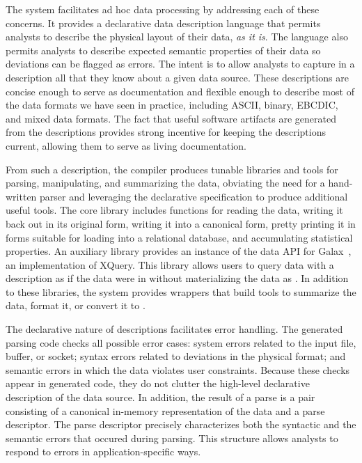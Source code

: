 \documentclass{sig-alternate}
\begin{document}
The \pads{} system facilitates ad hoc data processing by addressing
each of these concerns.  It provides a declarative data description
language that permits analysts to describe the physical layout of
their data, \textit{as it is}.  The language also permits analysts to
describe expected semantic properties of their data so deviations can
be flagged as errors. The intent is to allow analysts to capture in a
\pads{} description all that they know about a given data source.
These descriptions are concise enough to
serve as documentation and flexible enough to describe most of
the data formats we have seen in practice, including ASCII, binary,
EBCDIC, and mixed data formats.  The fact that useful software
artifacts are generated from the descriptions provides strong
incentive for keeping the descriptions current, allowing them to serve
as living documentation.  

From such a description, the \pads{} compiler produces tunable \C{} libraries
and tools for parsing, manipulating, and summarizing the data,
obviating the need for a hand-written parser and leveraging the
declarative specification to produce additional useful tools. 
The core \C{} library includes functions for reading the data, writing it 
back out in its original form, writing it into a canonical \xml{} form, pretty printing
it in forms suitable for loading into a relational database, and accumulating  
statistical properties.  An auxiliary library provides 
an instance of the data API for Galax~\cite{galax,galaxmanual}, an implementation of XQuery.  This 
library allows users to query data with a \pads{} description as if the data were
in \xml{} without materializing the data as \xml{}.  In addition to these libraries,
the \pads{} system provides wrappers that build tools to 
summarize the data, format it,  or convert it to \xml{}.

The declarative nature of \pads{} descriptions facilitates error handling.
The generated parsing code checks all possible error cases: system
errors related to the input file, buffer, or socket; syntax errors
related to deviations in the physical format; and semantic errors in
which the data violates user constraints.  Because these checks appear
in generated code, they do not clutter the high-level declarative
description of the data source.
In addition, the result of a parse is a pair consisting of a canonical in-memory
representation of the data and a parse descriptor. The parse
descriptor precisely characterizes both the syntactic and the semantic
errors that occured during parsing.  This structure allows analysts
to respond to errors in application-specific ways.  
\end{document}
